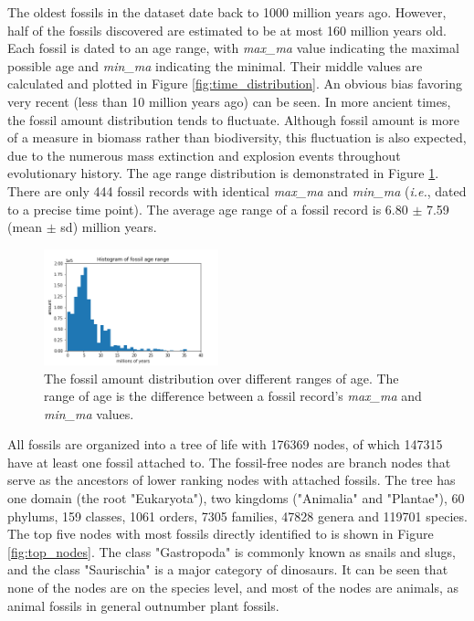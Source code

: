 \documentclass[11pt, a4paper,oneside,chapterprefix=false]{scrbook}
\begin{document}
\newpage
The oldest fossils in the dataset date back to 1000 million years ago. However, half of the fossils discovered are estimated to be at most 160 million years old. Each fossil is dated to an age range, with \emph{max\_ma} value indicating the maximal possible age and \emph{min\_ma} indicating the minimal. Their middle values are calculated and plotted in Figure \ref{fig:time_distribution}. An obvious bias favoring very recent (less than 10 million years ago) can be seen. In more ancient times, the fossil amount distribution tends to fluctuate. Although fossil amount is more of a measure in biomass rather than biodiversity, this fluctuation is also expected, due to the numerous mass extinction and explosion events throughout evolutionary history. The age range distribution is demonstrated in Figure \ref{fig:age_range}. There are only 444 fossil records with identical \emph{max\_ma} and \emph{min\_ma} (\emph{i.e.}, dated to a precise time point). The average age range of a fossil record is 6.80 $\pm$ 7.59 (mean $\pm$  sd) million years.

\begin{figure}[h]
	\centering
	\includegraphics[width=0.45\textwidth]{figures/result/age_range}
	\caption{The fossil amount distribution over different ranges of age. The range of age is the difference between a fossil record's \emph{max\_ma} and \emph{min\_ma} values. }
	\label{fig:age_range}
\end{figure}

All fossils are organized into a tree of life with 176369 nodes, of which 147315 have at least one fossil attached to. The fossil-free nodes are branch nodes that serve as the ancestors of lower ranking nodes with attached fossils. The tree has one domain (the root "Eukaryota"), two kingdoms ("Animalia" and "Plantae"), 60 phylums, 159 classes, 1061 orders, 7305 families, 47828 genera and 119701 species. The top five nodes with most fossils directly identified to is shown in Figure \ref{fig:top_nodes}. The class "Gastropoda" is commonly known as snails and slugs, and the class "Saurischia" is a major category of dinosaurs. It can be seen that none of the nodes are on the species level, and most of the nodes are animals, as animal fossils in general outnumber plant fossils. \\
\end{document}
